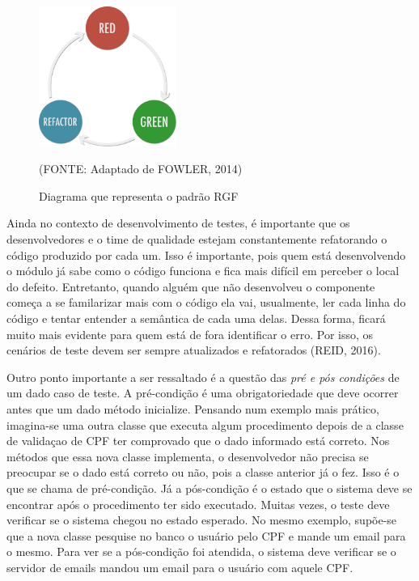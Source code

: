 \documentclass[
    12pt,       %
    openright,      %
    twoside,      %
    a4paper,      %
    english,      %
    french,       %
    spanish,      %
    brazil,       %
    ]{abntex2}
\begin{document}
      \begin{figure}[htbp]
          \begin{center}
              \includegraphics[width=0.4\textwidth]{img/rgf.png}
          \end{center}
          \caption{\label{fig:passaro}Diagrama que representa o padrão RGF}
          \begin{center}(FONTE: Adaptado de FOWLER, 2014)\end{center}
      \end{figure}

      Ainda no contexto de desenvolvimento de testes, é importante que os desenvolvedores
      e o time de qualidade estejam constantemente refatorando o código produzido por
      cada um. Isso é importante, pois quem está desenvolvendo o módulo já sabe como
      o código funciona e fica mais difícil em perceber o local do defeito. Entretanto,
      quando alguém que não desenvolveu o componente começa a se familarizar mais com o código
      ela vai, usualmente, ler cada linha do código e tentar entender a semântica de cada
      uma delas. Dessa forma, ficará muito mais evidente para quem está de fora identificar
      o erro. Por isso, os cenários de teste devem ser sempre atualizados e refatorados
      (REID, 2016).

      Outro ponto importante a ser ressaltado é a questão das \textit{pré e pós condições} de
      um dado caso de teste. A pré-condição é uma obrigatoriedade que deve ocorrer
      antes que um dado método inicialize. Pensando num exemplo mais prático,
      imagina-se uma outra classe que executa algum procedimento depois de a classe
      de validaçao de CPF ter comprovado que o dado informado está correto. Nos métodos
      que essa nova classe implementa, o desenvolvedor não precisa se preocupar se o
      dado está correto ou não, pois a classe anterior já o fez. Isso é o que se chama
      de pré-condição. Já a pós-condição é o estado que o sistema deve se encontrar
      após o procedimento ter sido executado. Muitas vezes, o teste deve verificar
      se o sistema chegou no estado esperado. No mesmo exemplo, supõe-se que a nova
      classe pesquise no banco o usuário pelo CPF e mande um email para o mesmo. Para
      ver se a pós-condição foi atendida, o sistema deve verificar se o servidor de
      emails mandou um email para o usuário com aquele CPF.
\end{document}
